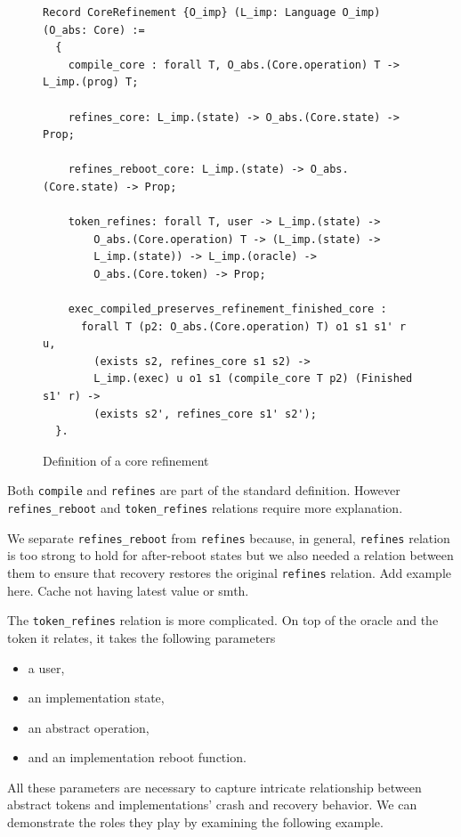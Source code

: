\begin{figure}[ht]
    \centering
    \begin{verbatim}
Record CoreRefinement {O_imp} (L_imp: Language O_imp) (O_abs: Core) :=
  {
    compile_core : forall T, O_abs.(Core.operation) T -> L_imp.(prog) T;
    
    refines_core: L_imp.(state) -> O_abs.(Core.state) -> Prop;
    
    refines_reboot_core: L_imp.(state) -> O_abs.(Core.state) -> Prop;
    
    token_refines: forall T, user -> L_imp.(state) -> 
        O_abs.(Core.operation) T -> (L_imp.(state) -> 
        L_imp.(state)) -> L_imp.(oracle) -> 
        O_abs.(Core.token) -> Prop;
    
    exec_compiled_preserves_refinement_finished_core :
      forall T (p2: O_abs.(Core.operation) T) o1 s1 s1' r u,
        (exists s2, refines_core s1 s2) ->
        L_imp.(exec) u o1 s1 (compile_core T p2) (Finished s1' r) ->
        (exists s2', refines_core s1' s2');
  }.
    \end{verbatim}
    \caption{Definition of a core refinement}
    \label{fig:Core_Refinement_Definition}
\end{figure}

Both \texttt{compile} and \texttt{refines} are part of the standard definition. However \texttt{refines\_reboot} and \texttt{token\_refines} relations require more explanation.

We separate \texttt{refines\_reboot} from \texttt{refines} because, in general, \texttt{refines} relation is too strong to hold for after-reboot states but we also needed a relation between them to ensure that recovery restores the original \texttt{refines} relation. {\color{red} Add example here. Cache not having latest value or smth.}

The \texttt{token\_refines} relation is more complicated. On top of the oracle and the token it relates, it takes the following parameters
\begin{itemize}
    \item a user,
    \item an implementation state,
    \item an abstract operation,
    \item and an implementation reboot function.
\end{itemize}
All these parameters are necessary to capture intricate relationship between abstract tokens and implementations' crash and recovery behavior. We can demonstrate the roles they play by examining the following example.

